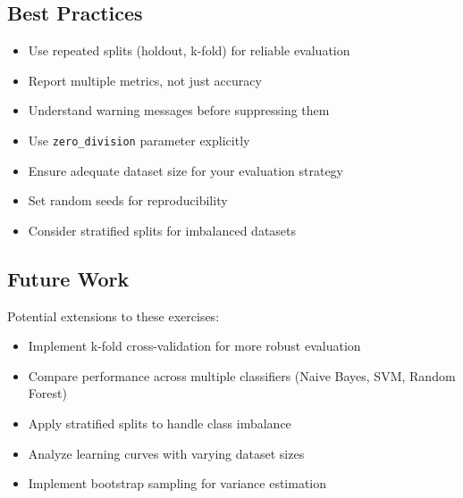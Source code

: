 \documentclass[12pt,a4paper]{article}
\begin{document}
\subsection{Best Practices}

\begin{itemize}
    \item Use repeated splits (holdout, k-fold) for reliable evaluation
    \item Report multiple metrics, not just accuracy
    \item Understand warning messages before suppressing them
    \item Use \texttt{zero\_division} parameter explicitly
    \item Ensure adequate dataset size for your evaluation strategy
    \item Set random seeds for reproducibility
    \item Consider stratified splits for imbalanced datasets
\end{itemize}

\subsection{Future Work}

Potential extensions to these exercises:
\begin{itemize}
    \item Implement k-fold cross-validation for more robust evaluation
    \item Compare performance across multiple classifiers (Naive Bayes, SVM, Random Forest)
    \item Apply stratified splits to handle class imbalance
    \item Analyze learning curves with varying dataset sizes
    \item Implement bootstrap sampling for variance estimation
\end{itemize}
\end{document}
